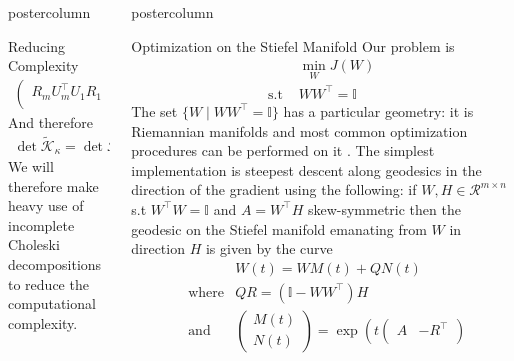 \documentclass{beamer}
\newlength{\columnheight}
\begin{document}
\begin{frame}
\begin{columns}
\begin{column}{.5\textwidth}
\begin{beamercolorbox}[center]{postercolumn}
\begin{minipage}{.98\textwidth}
{\begin{myblock}{Reducing Complexity}
\begin{align*}
\begin{pmatrix}
								R_m U_m^\intercal U_1 R_1 & R_m U_m^\intercal U_2 R_2 & \cdots & \mathbb{I} \\
							\end{pmatrix}
						\end{align*}
						And therefore
						\begin{align*}
							\det \tilde{\mathcal{K}}_\kappa = \det \mathcal{R}_\kappa
						\end{align*}
						We will therefore make heavy use of incomplete Choleski decompositions to reduce the computational complexity.
					\end{myblock}\vfill
		}\end{minipage}\end{beamercolorbox}
	\end{column}
	\begin{column}{.5\textwidth}
		\begin{beamercolorbox}[center]{postercolumn}
			\begin{minipage}{.98\textwidth} %
				\parbox[t][\columnheight]{\textwidth}{ %
					\begin{myblock}{Optimization on the Stiefel Manifold}
						Our problem is
						\begin{align*}
							&\min_W J(W) \\
							\text{s.t } &W W^\intercal = \mathbb{I}
						\end{align*}
						The set $\{ W \mid W W^\intercal = \mathbb{I} \}$ has a particular geometry: it is Riemannian manifolds and most common optimization procedures can be performed on it \cite{Edelman1998}.
						The simplest implementation is steepest descent along geodesics in the direction of the gradient using the following: if $W, H \in \mathcal{R}^{m \times n}$ s.t $W^\intercal W = \mathbb{I}$ and $A = W^\intercal H$ skew-symmetric then the geodesic on the Stiefel manifold emanating from $W$ in direction $H$ is given by the curve
						\begin{align*}
							& &W (t) = W M (t) + Q N (t) \\
							&\text{where} & QR = (\mathbb{I} - W W^\intercal) H \\
							&\text{and} &\begin{pmatrix}
							 M(t) \\ N(t)
						 \end{pmatrix} = \exp \left( t \begin{pmatrix}
							 A & - R^\intercal \\

\end{pmatrix}
\end{align*}
\end{myblock}}
\end{minipage}
\end{beamercolorbox}
\end{column}
\end{columns}
\end{frame}
\end{document}
